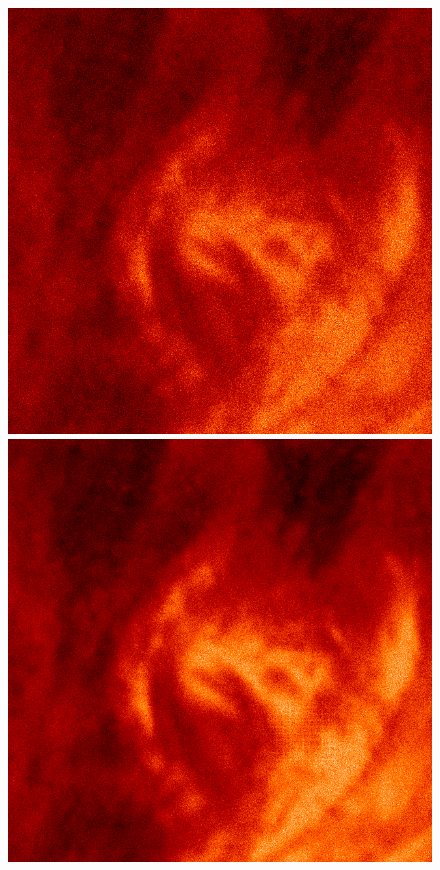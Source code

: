 \documentclass[tocnosub,noragright,centerchapter,12pt]{uiucecethesis09}
\begin{document}
\begin{figure}
{\begin{minipage}{.19\textwidth}
  \end{minipage}%
  \begin{minipage}{.19\textwidth}
    \centering
    \includegraphics[width=.95\textwidth]{figures/aia_recon20.png}
  \end{minipage}%
  \begin{minipage}{.19\textwidth}
    \centering
    \includegraphics[width=.95\textwidth]{figures/aia_recon50.png}

\end{minipage}}
\end{figure}
\end{document}
